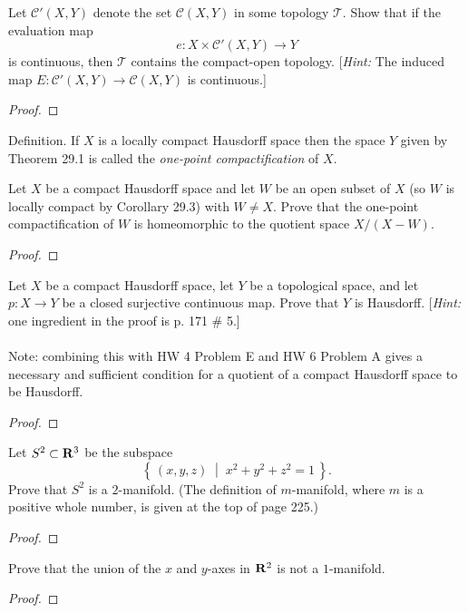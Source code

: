 \newpage
\begin{problem}[Munkres \S 46, Ex.\,8]
Let $\mathcal{C}'(X,Y)$ denote the set $\mathcal{C}(X,Y)$ in some
topology $\mathcal{T}$. Show that if the evaluation map
\[
e\colon X\times\mathcal{C}'(X,Y)\longrightarrow Y
\]
is continuous, then $\mathcal{T}$ contains the compact-open
topology. [\emph{Hint:} The induced map
$E\colon\mathcal{C}'(X,Y)\to\mathcal{C}(X,Y)$ is continuous.]
\end{problem}
\begin{proof}
\end{proof}
\newpage
\begin{problem}[(A)]
\begin{definition}
Definition. If $X$ is a locally compact Hausdorff space then the
space $Y$ given by Theorem 29.1 is called the \emph{one-point
  compactification} of $X$.
\end{definition}

Let $X$ be a compact Hausdorff space and let $W$ be an open
subset of $X$ (so $W$ is locally compact by Corollary 29.3) with
$W\neq X$. Prove that the one-point compactification of $W$ is
homeomorphic to the quotient space $X/(X-W)$.
\end{problem}
\begin{proof}
\end{proof}
\newpage
\begin{problem}[(B)]
Let $X$ be a compact Hausdorff space, let $Y$ be a topological
space, and let $p\colon X\to Y$ be a closed surjective continuous
map. Prove that $Y$ is Hausdorff. [\emph{Hint:} one ingredient in the
proof is p. 171 \# 5.]
\\\\
Note: combining this with HW 4 Problem E and HW 6 Problem A gives
a necessary and sufficient condition for a quotient of a compact
Hausdorff space to be Hausdorff.
\end{problem}
\begin{proof}
\end{proof}
\newpage
\begin{problem}[(C)]
Let $S^2\subset\mathbf{R}^3$ be the subspace
\[
\left\{\,(x,y,z)\;\middle|\; x^2+y^2+z^2=1\,\right\}.
\]
Prove that $S^2$ is a $2$-manifold. (The definition of
$m$-manifold, where $m$ is a positive whole number, is given at
the top of page 225.)
\end{problem}
\begin{proof}
\end{proof}
\newpage
\begin{problem}[(D)]
Prove that the union of the $x$ and $y$-axes in $\mathbf{R}^2$ is not a
$1$-manifold.
\end{problem}
\begin{proof}
\end{proof}

